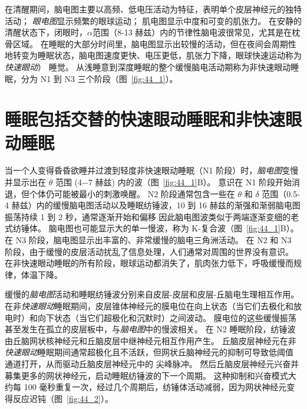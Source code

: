 在清醒期间，脑电图主要以高频、低电压活动为特征，表明单个皮层神经元的独特活动；
\textit{眼电图}显示频繁的眼球运动；
肌电图显示中度和可变的肌张力。
在安静的清醒状态下，闭眼时，$ \alpha $范围（8-13 赫兹）内的节律性脑电波很常见，尤其是在枕骨区域。
在睡眠的大部分时间里，脑电图显示出较慢的活动，但在夜间会周期性地转变为睡眠状态，脑电图速度更快、电压更低，肌张力下降，眼球快速运动称为\textit{快速眼动}） 睡觉。
从浅睡意到深度睡眠的整个缓慢脑电活动期称为非快速眼动睡眠，分为 N1 到 N3 三个阶段（图~\ref{fig:44_1}）。



\section{睡眠包括交替的快速眼动睡眠和非快速眼动睡眠}

当一个人变得昏昏欲睡并过渡到轻度非快速眼动睡眠（N1 阶段）时，\textit{脑电图}变慢并显示出在 $ \theta $ 范围 (4−7 赫兹) 内的波（图~\ref{fig:44_1}B）。
意识在 N1 阶段开始消退，但个体仍可能被最小的刺激唤醒。
N2 阶段通常包含一些在 $ \theta $ 和 $ \delta $ 范围（0.5-4 赫兹）内的缓慢脑电图活动以及睡眠纺锤波，10 到 16 赫兹的渐强和渐弱脑电图振荡持续 1 到 2 秒，通常逐渐开始和偏移 因此脑电图波类似于两端逐渐变细的老式纺锤体。
脑电图也可能显示大的单一慢波，称为 K-复合波（图~\ref{fig:44_1}B）。
在 N3 阶段，脑电图显示出丰富的、非常缓慢的脑电三角洲活动。
在 N2 和 N3 阶段，由于缓慢的皮层活动扰乱了信息处理，人们通常对周围的世界没有意识。
在非快速眼动睡眠的所有阶段，眼球运动都消失了，肌肉张力低下，呼吸缓慢而规律，体温下降。


缓慢的\textit{脑电图}活动和睡眠纺锤波分别来自皮层-皮层和皮层-丘脑电生理相互作用。
在非\textit{快速眼动}睡眠期间，皮层锥体神经元的膜电位在向上状态（当它们去极化和放电时）和向下状态（当它们超极化和沉默时）之间波动。
膜电位的这些缓慢振荡甚至发生在孤立的皮层板中，与\textit{脑电图}中的慢波相关。
在 N2 睡眠阶段，纺锤波由丘脑网状核神经元和丘脑皮层中继神经元相互作用产生。
丘脑皮层神经元在非\textit{快速眼动}睡眠期间通常超极化且不活跃，但网状丘脑神经元的抑制可导致低阈值  通道打开，从而驱动丘脑皮层神经元中的  尖峰脉冲。
然后丘脑皮层神经元兴奋并募集更多的网状神经元，启动睡眠纺锤波的下一个周期。
这种抑制和兴奋模式大约每 100 毫秒重复一次，经过几个周期后，纺锤体活动减弱，因为网状神经元变得反应迟钝（图~\ref{fig:44_2}）。


